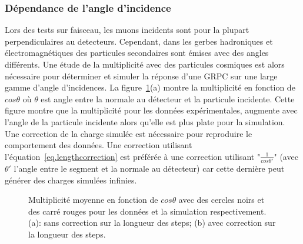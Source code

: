\subsubsection{Dépendance de l'angle d'incidence}
Lors des tests sur faisceau, les muons incidents sont pour la plupart perpendiculaires au detecteurs. Cependant, dans les gerbes hadroniques et électromagnétiques des particules secondaires sont émises avec des angles différents. Une étude de la multiplicité avec des particules cosmiques est alors nécessaire pour déterminer et simuler la réponse d'une GRPC sur une large gamme d'angle d'incidences. La figure~\ref{fig.mul_vs_theta}(a) montre la multiplicité en fonction de $cos{\theta}$ où $\theta$ est angle entre la normale au détecteur et la particule incidente. Cette figure montre que la multiplicité pour les données expérimentales, augmente avec l'angle de la particule incidente alors qu'elle est plus plate pour la simulation. Une correction de la charge simulée est nécessaire pour reproduire le comportement des données. Une correction utilisant l'équation~\ref{eq.lengthcorrection} est préférée à une correction utilisant "$\frac{1}{cos\theta'}$" (avec $\theta'$ l'angle entre le segment et la normale au détecteur) car cette dernière peut générer des charges simulées infinies. 
\begin{figure}[!ht]
  \caption{Multiplicité moyenne en fonction de $cos\theta$ avec des cercles noirs et des carré rouges pour les données et la simulation respectivement. (a): sans correction sur la longueur des steps; (b) avec correction sur la longueur des steps. \label{fig.mul_vs_theta}}
\end{figure}
